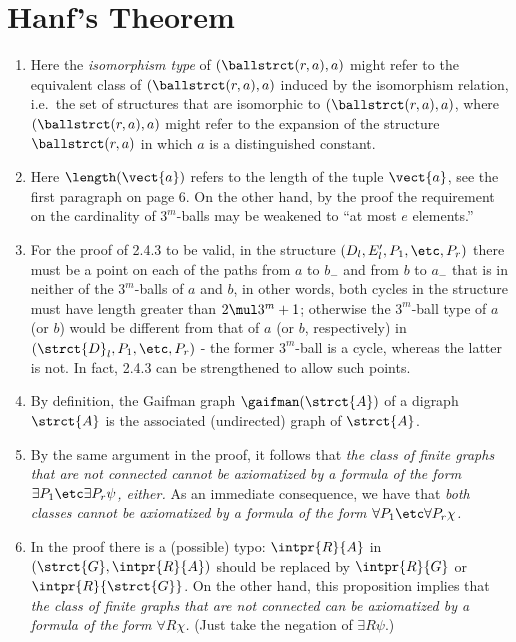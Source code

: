 \section{Hanf's Theorem}
\begin{enumerate}[1.]
%
\item {} Here the \emph{isomorphism type} of $(\ballstrct(r, a), a)$ might refer to the equivalent class of $(\ballstrct(r, a), a)$ induced by the isomorphism relation, i.e.\ the set of structures that are isomorphic to $(\ballstrct(r, a), a)$, where $(\ballstrct(r, a), a)$ might refer to the expansion of the structure $\ballstrct(r, a)$ in which $a$ is a distinguished constant.
%
\item {} Here $\length(\vect{a})$ refers to the length of the tuple $\vect{a}$, see the first paragraph on page 6.
\newpar
On the other hand, by the proof the requirement on the cardinality of $3^m$-balls may be weakened to ``at most $e$ elements.''
%
\item {} For the proof of 2.4.3 to be valid, in the structure $(D_l, E'_l, P_1, \etc, P_r)$ there must be a point on each of the paths from $a$ to $b_-$ and from $b$ to $a_-$ that is in neither of the $3^m$-balls of $a$ and $b$, in other words, both cycles in the structure must have length greater than $2 \mul 3^m + 1$; otherwise the $3^m$-ball type of $a$ (or $b$) would be different from that of $a$ (or $b$, respectively) in $(\strct{D}_l, P_1, \etc, P_r)$ - the former $3^m$-ball is a cycle, whereas the latter is not.
\newpar
In fact, 2.4.3 can be strengthened to allow such points.
%
\item {} By definition, the Gaifman graph $\gaifman(\strct{A})$ of a digraph $\strct{A}$ is the associated (undirected) graph of $\strct{A}$.
%
\item {} By the same argument in the proof, it follows that \emph{the class of finite graphs that are not connected cannot be axiomatized by a formula of the form $\exists P_1 \etc \exists P_r \psi$, either.}
\newpar
As an immediate consequence, we have that \emph{both classes cannot be axiomatized by a formula of the form $\forall P_1 \etc \forall P_r \chi$.}
%
\item {} In the proof there is a (possible) typo: $\intpr{R}{A}$ in $(\strct{G}, \intpr{R}{A})$ should be replaced by $\intpr{R}{G}$ or $\intpr{R}{\strct{G}}$.
\newpar
On the other hand, this proposition implies that \emph{the class of finite graphs that are not connected can be axiomatized by a formula of the form $\forall R \chi$.} (Just take the negation of $\exists R \psi$.)

\end{enumerate}

